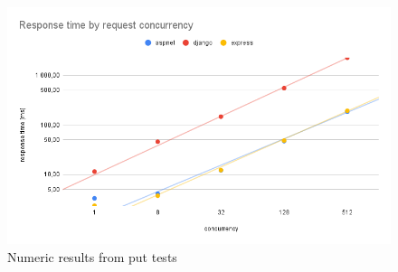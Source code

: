 \begin{figure}[H]
    \includegraphics[width=\columnwidth]{figures/pictures/resultsPut.png}
    \caption{Numeric results from put tests}
    \label{fig:resultsPut}
\end{figure}
